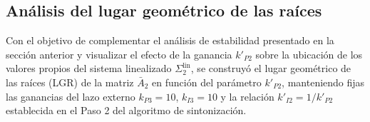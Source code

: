 

\subsection{Análisis del lugar geométrico de las raíces}

Con el objetivo de complementar el análisis de estabilidad presentado en la
sección anterior y visualizar el efecto de la ganancia $k'_{P2}$ sobre la
ubicación de los valores propios del sistema linealizado $\Sigma_2^{\text{lin}}$,
se construyó el lugar geométrico de las raíces (LGR) de la matriz $\bar{A}_2$
en función del parámetro $k'_{P2}$, manteniendo fijas las ganancias del lazo
externo $k_{P3} = 10$, $k_{I3} = 10$ y la relación $k'_{I2} = 1/k'_{P2}$
establecida en el Paso 2 del algoritmo de sintonización.
\\ 


